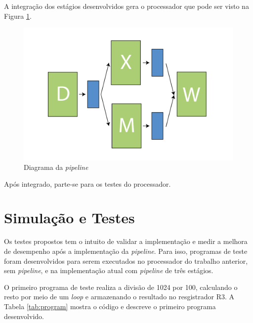 \documentclass[11pt,a4paper,titlepage]{article}
\begin{document}
A integração dos estágios desenvolvidos gera o processador que pode ser visto na Figura \ref{fig:pipeline_diagram}.

\begin{figure}[!h]
\centering
\includegraphics[scale=0.5]{images/pipeline_diagram.png}
\caption{Diagrama da \textit{pipeline}}
\label{fig:pipeline_diagram}
\end{figure}

Após integrado, parte-se para os testes do processador.

\section{Simulação e Testes}

Os testes propostos tem o intuito de validar a implementação e medir a melhora de desempenho após a implementação da \textit{pipeline}. Para isso, programas de teste foram desenvolvidos para serem executados no processador do trabalho anterior, sem \textit{pipeline}, e na implementação atual com \textit{pipeline} de três estágios.

O primeiro programa de teste realiza a divisão de 1024 por 100, calculando o resto por meio de um \textit{loop} e armazenando o resultado no resgistrador R3. A Tabela \ref{tab:program} mostra o código e descreve o primeiro programa desenvolvido.
\end{document}
